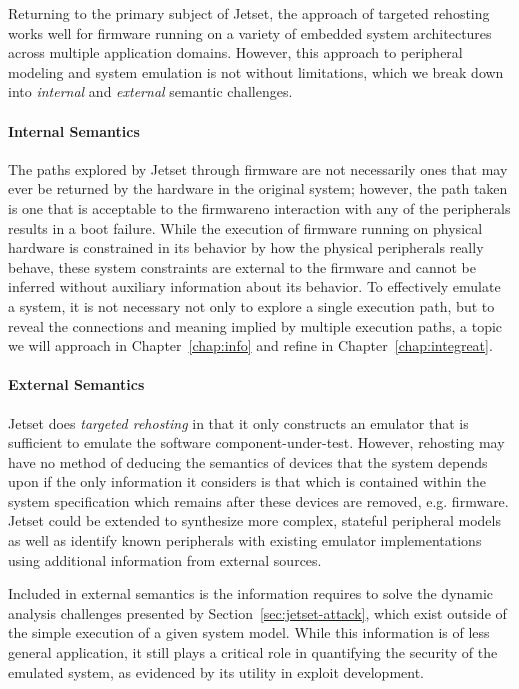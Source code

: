 Returning to the primary subject of Jetset, the approach of targeted rehosting works well for firmware running on a variety of embedded system architectures across multiple application domains. 
However, this approach to peripheral modeling and system emulation is not without limitations, which we break down into \emph{internal} and \emph{external} semantic challenges.

\paragraph{Internal Semantics}
The paths explored by Jetset through firmware are not necessarily ones that may ever be returned by the hardware in the original system; however, the path taken is one that is acceptable to the firmware\textemdash no interaction with any of the peripherals results in a boot failure.
While the execution of firmware running on physical hardware is constrained in its behavior by how the physical peripherals really behave, these system constraints are external to the firmware and cannot be inferred without auxiliary information about its behavior.
To effectively emulate a system, it is not necessary not only to explore a single execution path, but to reveal the connections and meaning implied by multiple execution paths, a topic we will approach in Chapter~\ref{chap:info} and refine in Chapter~\ref{chap:integreat}.

\paragraph{External Semantics}
Jetset does \textit{targeted rehosting} in that it only constructs an emulator that is sufficient to emulate the software component-under-test.
However, rehosting may have no method of deducing the semantics of devices that the system depends upon if the only information it considers is that which is contained within the system specification which remains after these devices are removed, e.g. firmware.
Jetset could be extended to synthesize more complex, stateful peripheral models as well as identify known peripherals with existing emulator implementations using additional information from external sources.

Included in external semantics is the information requires to solve the dynamic analysis challenges presented by Section~\ref{sec:jetset-attack}, which exist outside of the simple execution of a given system model.
While this information is of less general application, it still plays a critical role in quantifying the security of the emulated system, as evidenced by its utility in exploit development.

